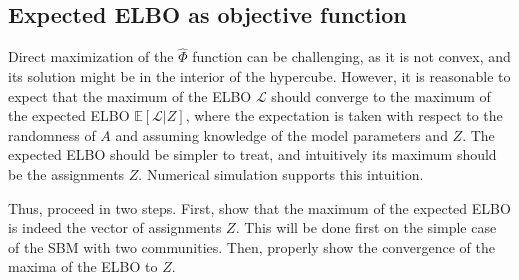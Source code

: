\documentclass[../../main.tex]{subfiles} %
\begin{document}
\begin{comment}
	\subsubsection{Asymptotic objective function}
	
	Observe that the function in \ref{eq:phinotation} is an objective function 
	depending on the graph observed. In particular, it is a function of the 
	size of 
	the graph. It is reasonable to expect that, keeping the underlying model 
	fixed 
	and growing the size \(n\) of the graph sampled from it, we would have an 
	asymptotic objective to which the objective functions \ref{eq:phinotation} 
	converge, and which is independent from any particular observation. Let us 
	calculate this.
	
	As a first simplification, it is easy to see that the first two terms 
	vanish, 
	as \(C \gg n\) when \(n \to \infty\). A second simplification is to perform 
	a 
	change of basis so that the structure of \(A\) and \(J\) becomes 
	simplified. 
	One might consider diagonalizing \(A\), but this does not simplify \(J\). 
	Consider instead the normalized graph Laplacian \(L \coloneqq 
	D^{-\frac{1}{2}} A 
	D^{-\frac{1}{2}}\). We need to know to what vectors its eigenvectors 
	converge. 
	This has been studied in \cite{rohe_spectral_2011} and improved in 
	\cite{deng_strong_2020}.
\end{comment}

\subsection{Expected ELBO as objective function}

Direct maximization of the \(\hat \Phi\) function can be challenging, as it 
is not convex, and its solution might be in the interior of the 
hypercube. However, it is reasonable to expect that the maximum of the ELBO 
\(\mathcal L\) should converge to the maximum of the expected ELBO \(\mathbb E 
[\mathcal L \vert Z]\), where the expectation is taken with respect to the 
randomness of \(A\) and assuming knowledge of the model parameters and \(Z\). 
The expected ELBO should be simpler to treat, and intuitively its maximum 
should be the assignments \(Z\). Numerical simulation supports this intuition.

Thus, proceed in two steps. First, show that the maximum of the expected ELBO 
is indeed the vector of assignments \(Z\). This will be done first on the 
simple case of the SBM with two communities. Then, properly show the 
convergence of the maxima of the ELBO to \(Z\).
\end{document}
